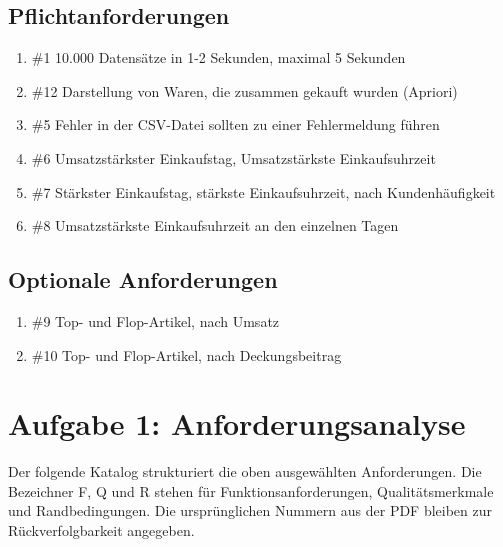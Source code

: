 \documentclass[a4paper,10pt]{article}
\begin{document}
        \subsection*{Pflichtanforderungen}
        \begin{enumerate}
            \item \#1 10.000 Datensätze in 1-2 Sekunden, maximal 5 Sekunden
            \item \#12 Darstellung von Waren, die zusammen gekauft wurden (Apriori)
            \item \#5 Fehler in der CSV-Datei sollten zu einer Fehlermeldung führen
            \item \#6 Umsatzstärkster Einkaufstag, Umsatzstärkste Einkaufsuhrzeit
            \item \#7 Stärkster Einkaufstag, stärkste Einkaufsuhrzeit, nach Kundenhäufigkeit
            \item \#8 Umsatzstärkste Einkaufsuhrzeit an den einzelnen Tagen
        \end{enumerate}

        \subsection*{Optionale Anforderungen}
        \begin{enumerate}
            \item \#9 Top- und Flop-Artikel, nach Umsatz
            \item \#10 Top- und Flop-Artikel, nach Deckungsbeitrag
        \end{enumerate}

        \clearpage


        \section*{Aufgabe 1: Anforderungsanalyse}

        Der folgende Katalog strukturiert die oben ausgewählten Anforderungen. Die Bezeichner F, Q und R stehen für Funktionsanforderungen, Qualitätsmerkmale und Randbedingungen. Die ursprünglichen Nummern aus der PDF bleiben zur Rückverfolgbarkeit angegeben.
\end{document}

